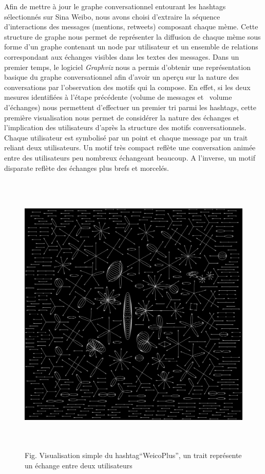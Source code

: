 Afin de mettre \`a jour le graphe conversationnel entourant les hashtags
s\'electionn\'es sur Sina Weibo, nous avons choisi
d{\textquoteright}extraire la s\'equence d{\textquoteright}interactions
des messages (mentions, retweets) composant chaque m\`eme. Cette
structure de graphe nous permet de repr\'esenter la diffusion de chaque
m\`eme sous forme d{\textquoteright}un graphe contenant un node par
utilisateur et un ensemble de relations correspondant aux \'echanges
visibles dans les textes des messages. Dans un premier temps, le
logiciel \textit{Graphviz }nous a permis d{\textquoteright}obtenir une
repr\'esentation basique du graphe conversationnel afin
d{\textquoteright}avoir un aper\c{c}u sur la nature des conversations
par l{\textquoteright}observation des motifs qui la compose. En effet,
si les deux mesures identifi\'ees \`a l{\textquoteright}\'etape
pr\'ec\'edente (volume de messages et \ volume
d{\textquoteright}\'echanges) nous permettent
d{\textquoteright}effectuer un premier tri parmi les hashtags, cette
premi\`ere visualisation nous permet de consid\'erer la nature des
\'echanges et l{\textquoteright}implication des utilisateurs
d{\textquoteright}apr\`es la structure des motifs conversationnels.
Chaque utilisateur est symbolis\'e par un point et chaque message par
un trait reliant deux utilisateurs. Un motif tr\`es compact refl\`ete
une conversation anim\'ee entre des utilisateurs peu nombreux
\'echangeant beaucoup. A l{\textquoteright}inverse, un motif disparate
refl\`ete des \'echanges plus brefs et morcel\'es.

\begin{figure}
    \centering
    \includegraphics[width=5.5894in,height=5.4224in]{figures/chap3/chapitre3-img11.png}
    \caption[Visualisation simple du hashtag{\textquotedblleft}WeicoPlus{\textquotedblright}] {Fig. Visualisation simple du hashtag{\textquotedblleft}WeicoPlus{\textquotedblright}, un trait repr\'esente un \'echange entre deux utilisateurs}
\end{figure}

